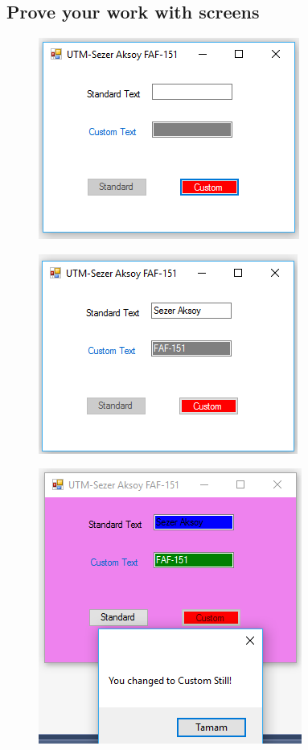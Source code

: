 \subsection{Prove your work with screens}

\begin{figure}
	\centering
	\includegraphics[width=0.7\linewidth]{first.PNG}
	\caption{}
	\label{fig:first}
\end{figure}

\begin{figure}
	\centering
	\includegraphics[width=0.7\linewidth]{second.PNG}
	\caption{}
	\label{fig:second}
\end{figure}

\begin{figure}
	\centering
	\includegraphics[width=0.7\linewidth]{thirth.PNG}
	\caption{}
	\label{fig:thirth}
\end{figure}

